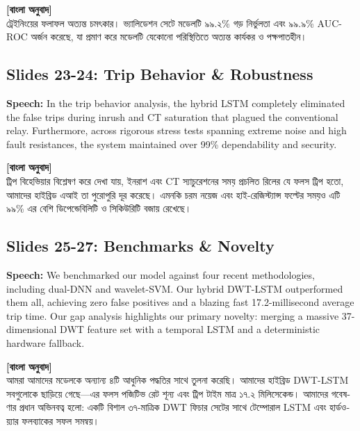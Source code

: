\documentclass[12pt]{article}
\begin{document}
\begin{bengali}
\textbf{[বাংলা অনুবাদ]} \\
ট্রেইনিংয়ের ফলাফল অত্যন্ত চমৎকার। ভ্যালিডেশন সেটে মডেলটি ৯৯.২\% গড় নির্ভুলতা এবং ৯৯.৯\% AUC-ROC অর্জন করেছে, যা প্রমাণ করে মডেলটি যেকোনো পরিস্থিতিতে অত্যন্ত কার্যকর ও পক্ষপাতহীন।
\end{bengali}

\subsection*{Slides 23-24: Trip Behavior \& Robustness}
\textbf{Speech:} In the trip behavior analysis, the hybrid LSTM completely eliminated the false trips during inrush and CT saturation that plagued the conventional relay. Furthermore, across rigorous stress tests spanning extreme noise and high fault resistances, the system maintained over 99\% dependability and security.

\begin{bengali}
\textbf{[বাংলা অনুবাদ]} \\
ট্রিপ বিহেভিয়ার বিশ্লেষণ করে দেখা যায়, ইনরাশ এবং CT স্যাচুরেশনের সময় প্রচলিত রিলের যে ফলস ট্রিপ হতো, আমাদের হাইব্রিড এআই তা পুরোপুরি দূর করেছে। এমনকি চরম নয়েজ এবং হাই-রেজিস্ট্যান্স ফল্টের সময়ও এটি ৯৯\% এর বেশি ডিপেন্ডেবিলিটি ও সিকিউরিটি বজায় রেখেছে।
\end{bengali}

\subsection*{Slides 25-27: Benchmarks \& Novelty}
\textbf{Speech:} We benchmarked our model against four recent methodologies, including dual-DNN and wavelet-SVM. Our hybrid DWT-LSTM outperformed them all, achieving zero false positives and a blazing fast 17.2-millisecond average trip time. Our gap analysis highlights our primary novelty: merging a massive 37-dimensional DWT feature set with a temporal LSTM and a deterministic hardware fallback.

\begin{bengali}
\textbf{[বাংলা অনুবাদ]} \\
আমরা আমাদের মডেলকে অন্যান্য ৪টি আধুনিক পদ্ধতির সাথে তুলনা করেছি। আমাদের হাইব্রিড DWT-LSTM সবগুলোকে ছাড়িয়ে গেছে—এর ফলস পজিটিভ রেট শূন্য এবং ট্রিপ টাইম মাত্র ১৭.২ মিলিসেকেন্ড। আমাদের গবেষণার প্রধান অভিনবত্ব হলো: একটি বিশাল ৩৭-মাত্রিক DWT ফিচার সেটের সাথে টেম্পোরাল LSTM এবং হার্ডওয়্যার ফলব্যাকের সফল সমন্বয়।
\end{bengali}
\end{document}
